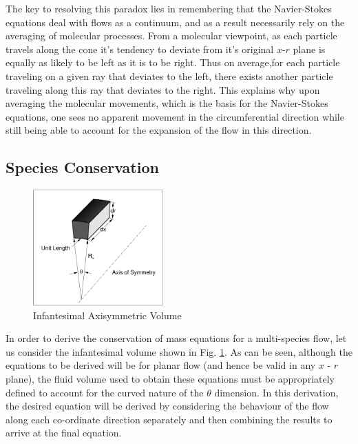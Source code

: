	The key to resolving this paradox lies in remembering that the Navier-Stokes equations 
deal with flows as a continuum, and as a result necessarily rely on the averaging of molecular
processes.  From a molecular viewpoint, as each particle travels along the cone it's tendency
to deviate from it's original $x$-$r$ plane is equally as likely to be left as it is to be right.  
Thus on average,for each particle traveling on a given ray that deviates to the left, 
there exists another particle traveling along this ray that deviates to the right.  This explains
why upon averaging the molecular movements, which is the basis for the Navier-Stokes equations, 
one sees no apparent movement in the circumferential direction while still being able to account
for the expansion of the flow in this direction.  

\subsection{Species Conservation}

\begin{figure}[!h]
\begin{center}
\includegraphics[width=5cm]{./infantesimal.eps}
\caption{Infantesimal Axisymmetric Volume}
\label{fig:inftes}
\end{center}
\end{figure}

	In order to derive the conservation of mass equations for a multi-species flow, let us 
consider the infantesimal volume shown in Fig. \ref{fig:inftes}.  As can be seen, although the
equations to be derived will be for planar flow (and hence be valid in any $x$ - $r$ plane),
the fluid volume used to obtain these equations must be appropriately defined to account for the
curved nature of the $\theta$ dimension.  In this derivation, the desired
equation will be derived by considering the behaviour of the flow along each co-ordinate direction
separately and then combining the results to arrive at the final equation.



